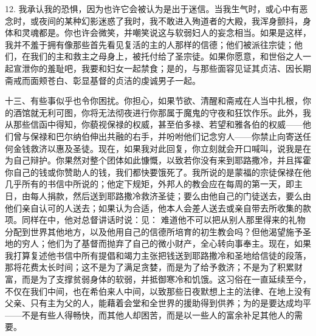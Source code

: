 12. 我承认我的恐惧，因为也许它会被认为是出于迷信。当我生气时，或心中有恶念时，或夜间的某种幻影迷惑了我时，我不敢进入殉道者的大殿，我浑身颤抖，身体和灵魂都是。你也许会微笑，并嘲笑说这与软弱妇人的妄念相当。如果是这样，我并不羞于拥有像那些首先看见复活的主的人那样的信德；他们被派往宗徒；他们，在我们的主和救主之母身上，被托付给了圣宗徒。如果你愿意，和世俗之人一起宣泄你的羞耻吧，我要和妇女一起禁食；是的，与那些面容见证其贞洁、因长期斋戒而面颊苍白、彰显基督的贞洁的虔诚男子一起。\par

十三、有些事似乎也令你困扰。你担心，如果节欲、清醒和斋戒在人当中扎根，你的酒馆就无利可图，你将无法彻夜进行你那属于魔鬼的守夜和狂饮作乐。此外，我从那些信函中得知，你藐视保禄的权威，甚至伯多禄、若望和雅各伯的权威——他们曾与保禄和巴尔纳伯伸出共融的右手，并吩咐他们记念穷人——你禁止向寄送任何金钱救济以惠及圣徒。现在，如果我对此回复，你立刻就会开口喊叫，说我是在为自己辩护。你果然对整个团体如此慷慨，以致若你没有来到耶路撒冷，并且挥霍你自己的钱或你赞助人的钱，我们都快要饿死了。我所说的是蒙福的宗徒保禄在他几乎所有的书信中所说的；他定下规矩，外邦人的教会应在每周的第一天，即主日，由每人捐款，然后送到耶路撒冷救济圣徒；要么由他自己的门徒送去，要么由他们亲自认可的人送去；如果认为合适，他本人会差人送去或亲自带去所收集的款项。同样在中，他对总督讲话时说：见： 难道他不可以把从别人那里得来的礼物分配到世界其他地方，以及他用自己的信德所培育的初生教会吗？但他渴望施予圣地的穷人；他们为了基督而抛弃了自己的微小财产，全心转向事奉主。现在，如果我打算复述他书信中所有提倡和竭力主张把钱送到耶路撒冷和圣地给信徒的段落，那将花费太长时间；这不是为了满足贪婪，而是为了给予救济；不是为了积累财富，而是为了支撑贫弱身体的软弱，并抵御寒冷和饥饿。这习俗在一直延续至今，不仅在我们中间，也在希伯来人中间，以致那些日夜默想上主的法律、在地上没有父亲、只有主为父的人，能藉着会堂和全世界的援助得到供养；为的是要达成均平——不是有些人得畅快，而其他人却困苦，而是以一些人的富余补足其他人的需要。\par

